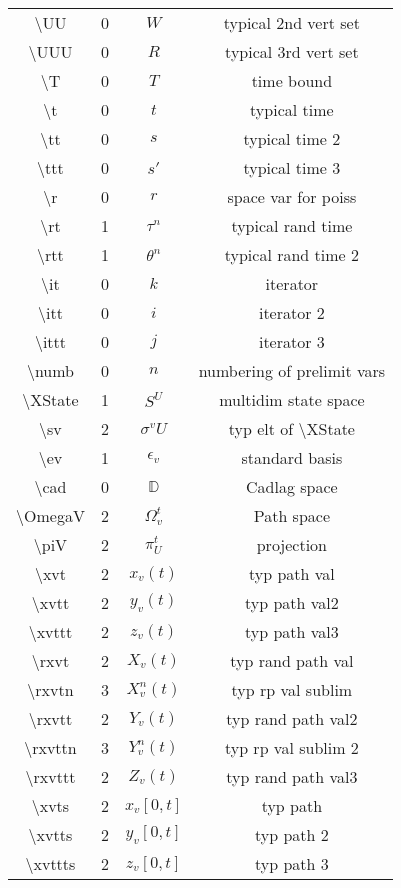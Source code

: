 \documentclass[12pt]{article}
\newcommand{\mb}{\mathbb}
\newcommand{\ep}{\epsilon}
\newcommand{\tbs}{\textbackslash}
\newcommand{\cad}{\mb{D}}							%
\renewcommand{\v}{v}							%
\renewcommand{\U}{U}							%
\newcommand{\UU}{W}								%
\newcommand{\UUU}{R}							%
\renewcommand{\S}{S}							%
\newcommand{\s}{\sigma}							%
\newcommand{\sv}[1]{\s^{#1}}					%
\newcommand{\ev}[1]{\ep_{#1}}					%
\newcommand{\T}{T}								%
\newcommand{\OmegaV}[2]{\Omega_{#1}^{#2}}		%
\renewcommand{\t}{t}							%
\renewcommand{\tt}{s}								%
\newcommand{\ttt}{s'}								%
\renewcommand{\r}{r}								%
\newcommand{\rt}[1]{\tau^{#1}}						%
\newcommand{\rtt}[1]{\theta^{#1}}					%
\renewcommand{\it}{k}								%
\newcommand{\itt}{i}								%
\newcommand{\ittt}{j}								%
\newcommand{\numb}{n}								%
\newcommand{\XState}[1]{\S^{#1}}				%
\newcommand{\piV}[2]{\pi_{#1}^{#2}}					%
\newcommand{\xvt}[2]{x_{#1}{(#2)}}					%
\newcommand{\xvtt}[2]{y_{#1}{(#2)}}					%
\newcommand{\xvttt}[2]{z_{#1}{(#2)}}				%
\newcommand{\rxvt}[2]{X_{#1}{(#2)}}					%
\newcommand{\rxvtn}[3]{X_{#1}^{#3}(#2)}				%
\newcommand{\rxvtt}[2]{Y_{#1}{(#2)}}				%
\newcommand{\rxvttn}[3]{Y_{#1}^{#3}(#2)}			%
\newcommand{\rxvttt}[2]{Z_{#1}{(#2)}}				%
\newcommand{\xvts}[2]{x_{#1}{#2}}					%
\newcommand{\xvtts}[2]{y_{#1}{#2}}					%
\newcommand{\xvttts}[2]{z_{#1}{#2}}					%
\begin{document}
\begin{longtable}{c|c|c|c}
\tbs UU&0&\(\UU\)								&typical 2nd vert set\\
\tbs UUU&0&\(\UUU\)								&typical 3rd vert set\\
\tbs T&0&\(\T\)									&time bound\\
\tbs t&0&\(\t\)								&typical time\\
\tbs tt&0&\(\tt\)								&typical time 2\\
\tbs ttt&0&\(\ttt\)							&typical time 3\\
\tbs r&0&\(\r\)								&space var for poiss\\
\tbs rt&1&\(\rt{\numb}\)					&typical rand time\\
\tbs rtt&1&\(\rtt{\numb}\)					&typical rand time 2\\
\tbs it&0& \(\it\)							&iterator\\
\tbs itt&0&\(\itt\)							&iterator 2\\
\tbs ittt&0&\(\ittt\)						&iterator 3\\
\tbs numb&0&\(\numb\)						&numbering of prelimit vars\\
\tbs XState&1&\(\XState{\U}\)				&multidim state space\\
\tbs sv&2&\(\sv{\v}{\U}\)					&typ elt of \tbs XState\\
\tbs ev&1&\(\ev{\v}\)						&standard basis\\
\tbs cad&0&\(\cad\)							&Cadlag space\\
\tbs OmegaV&2&\(\OmegaV{\v}{\t}\)			&Path space\\
\tbs piV&2&\(\piV{\U}{t}\)					&projection\\
\tbs xvt&2&\(\xvt{\v}{\t}\)					&typ path val\\
\tbs xvtt&2&\(\xvtt{\v}{\t}\)					&typ path val2\\
\tbs xvttt&2&\(\xvttt{\v}{\t}\)				&typ path val3\\
\tbs rxvt&2&\(\rxvt{\v}{\t}\)					&typ rand path val\\
\tbs rxvtn&3&\(\rxvtn{\v}{\t}{\numb}\)		&typ rp val sublim\\
\tbs rxvtt&2&\(\rxvtt{\v}{\t}\)				&typ rand path val2\\
\tbs rxvttn&3&\(\rxvttn{\v}{\t}{\numb}\)		&typ rp val sublim 2\\
\tbs rxvttt&2&\(\rxvttt{\v}{\t}\)				&typ rand path val3\\
\tbs xvts&2&\(\xvts{\v}{[0,\t]}\)					&typ path\\
\tbs xvtts&2&\(\xvtts{\v}{[0,\t]}\)					&typ path 2\\
\tbs xvttts&2&\(\xvttts{\v}{[0,\t]}\)					&typ path 3\\

\end{longtable}
\end{document}
